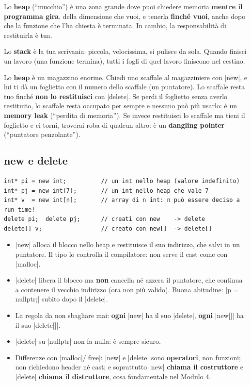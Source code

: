 Lo \textbf{heap} (``mucchio'') è una zona grande dove puoi chiedere memoria
\textbf{mentre il programma gira}, della dimensione che vuoi, e tenerla
\textbf{finché vuoi}, anche dopo che la funzione che l'ha chiesta è terminata.
In cambio, la responsabilità di restituirla è tua.

\begin{analogia}
Lo \textbf{stack} è la tua scrivania: piccola, velocissima, si pulisce da sola.
Quando finisci un lavoro (una funzione termina), tutti i fogli di quel lavoro
finiscono nel cestino.

Lo \textbf{heap} è un magazzino enorme. Chiedi uno scaffale al magazziniere con
\cc|new|, e lui ti dà un foglietto con il numero dello scaffale (un
puntatore). Lo scaffale resta tuo finché \textbf{non lo restituisci} con
\cc|delete|. Se perdi il foglietto senza averlo restituito, lo scaffale resta
occupato per sempre e nessuno può più usarlo: è un \textbf{memory leak}
(``perdita di memoria''). Se invece restituisci lo scaffale ma tieni il
foglietto e ci torni, troverai roba di qualcun altro: è un \textbf{dangling
pointer} (``puntatore penzolante'').
\end{analogia}

\subsection*{new e delete}

\begin{lstlisting}
int* pi = new int;          // un int nello heap (valore indefinito)
int* pj = new int(7);       // un int nello heap che vale 7
int* v  = new int[n];       // array di n int: n può essere deciso a run-time!
delete pi;  delete pj;      // creati con new    -> delete
delete[] v;                 // creato con new[]  -> delete[]
\end{lstlisting}
\begin{itemize}
  \item \cc|new| alloca il blocco nello heap e restituisce il suo indirizzo, che
        salvi in un puntatore. Il tipo lo controlla il compilatore: non serve il
        cast come con \cc|malloc|.
  \item \cc|delete| libera il blocco ma \textbf{non} cancella né azzera il
        puntatore, che continua a contenere il vecchio indirizzo (ora non più
        valido). Buona abitudine: \cc|p = nullptr;| subito dopo il \cc|delete|.
  \item La regola da non sbagliare mai: \textbf{ogni} \cc|new| ha il suo
        \cc|delete|, \textbf{ogni} \cc|new[]| ha il suo \cc|delete[]|.
  \item \cc|delete| su \cc|nullptr| non fa nulla: è sempre sicuro.
  \item Differenze con \cc|malloc|/\cc|free|: \cc|new| e \cc|delete| sono
        \textbf{operatori}, non funzioni; non richiedono header né cast; e
        soprattutto \cc|new| \textbf{chiama il costruttore} e \cc|delete|
        \textbf{chiama il distruttore}, cosa fondamentale nel Modulo 4.
\end{itemize}

